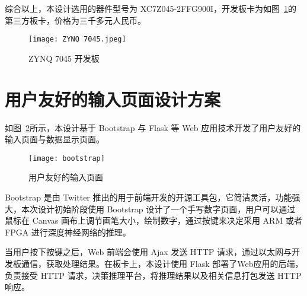 综合以上，本设计选用的器件型号为 XC7Z045-2FFG900I，开发板卡为如图~\ref{fig:ZYNQ 7045}的第三方板卡，价格为三千多元人民币。

\begin{figure}[!htbp]
    \centering
    \texttt{[image: ZYNQ 7045.jpeg]}
    \caption{ZYNQ 7045 开发板}
    \label{fig:ZYNQ 7045}
\end{figure}

\section{用户友好的输入页面设计方案}

如图~\ref{fig:BootStrap}所示，本设计基于 Bootstrap 与 Flask 等 Web 应用技术开发了用户友好的输入页面与数据显示页面。

\begin{figure}[!htbp]
    \centering
    \texttt{[image: bootstrap]}
    \caption{用户友好的输入页面}
    \label{fig:BootStrap}
\end{figure}

Bootstrap 是由 Twitter 推出的用于前端开发的开源工具包，它简洁灵活，功能强大，本次设计初始阶段使用 Bootstrap 设计了一个手写数字页面，用户可以通过鼠标在 Canvas 画布上调节画笔大小，绘制数字，通过按键来决定采用 ARM 或者 FPGA 进行深度神经网络的推理。

当用户按下按键之后，Web 前端会使用 Ajax 发送 HTTP 请求，通过以太网与开发板通信，获取处理结果。在板卡上，本设计使用 Flask 部署了Web应用的后端，负责接受 HTTP 请求，决策推理平台，将推理结果以及相关信息打包发送 HTTP 响应。

